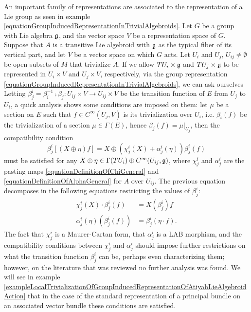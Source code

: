 An important family of representations are associated to the representation of a Lie group as seen in example \ref{equationGroupInducedRepresentationInTrivialAlgebroids}. Let $G$ be a group with Lie algebra $\mathfrak{g}$, and the vector space $V$ be a representation space of $G$. Suppose that $A$ is a transitive Lie algebroid with $\mathfrak{g}$ as the typical fiber of its vertical part, and let $V$ be a vector space on which $G$ acts. Let $U_i$ and $U_j$, $U_{ij} \neq \emptyset$ be open subsets of $M$ that trivialize $A$. If we allow $TU_i \times \mathfrak{g}$ and $TU_j \times \mathfrak{g}$ to be represented in $U_i \times V$ and $U_j \times V$, respectively, via the group representation \eqref{equationGroupInducedRepresentationInTrivialAlgebroids}, we can ask ourselves  Letting $\beta^i_j = \beta_i^{-1} \comp \beta_j : U_{ij} \times V \to U_{ij} \times V$ be the transition function of $E$ from $U_j$ to $U_i$, a quick analysis shows some conditions are imposed on them: let $\mu$ be a section on $E$ such that $f \in C^\infty(U_{j}, V)$ is its trivialization over $U_i$, i.e. $\beta_i(f) $ be the trivialization of a section $\mu \in \Gamma(E)$, hence $\beta_j(f) = \mu|_{U_j}$, then the compatibility condition 
\begin{equation}
    \beta_j^i[(X \oplus \eta) f] = X \oplus (\chi^i_j(X) + \alpha^i_j(\eta))\beta^i_j(f)
\end{equation}
must be satisfied for any $X \oplus \eta \in \Gamma(TU_i) \oplus C^\infty(U_{ij}, \mathfrak{g})$, where $\chi^i_j$ and $\alpha^i_j$ are the pasting maps \eqref{equationDefinitionOfChiGeneral} and \eqref{equationDefinitionOfAlphaGeneral} for $A$ over $U_{ij}$. The previous equation decomposes in the following equations restricting the values of $\beta^i_j$:
\begin{align}
    \chi^i_j(X) \cdot \beta^i_j(f) &= X(\beta^i_j)f\\
    \alpha^i_j(\eta)(\beta^i_j(f)) &= \beta^i_j(\eta \cdot f).
\end{align}
The fact that $\chi^i_j$ is a Maurer-Cartan form, that $\alpha^i_j$ is a LAB morphism, and the compatibility conditions between $\chi^i_j$ and $\alpha^i_j$ should impose further restrictions on what the transition function $\beta^i_j$ can be, perhaps even characterizing them; however, on the literature that was reviewed no further analysis was found. We will see in example \ref{exampleLocalTrivializationOfGroupInducedRepresentationOfAtiyahLieAlgebroidAction} that in the case of the standard representation of a principal bundle on an associated vector bundle these conditions are satisfied.


